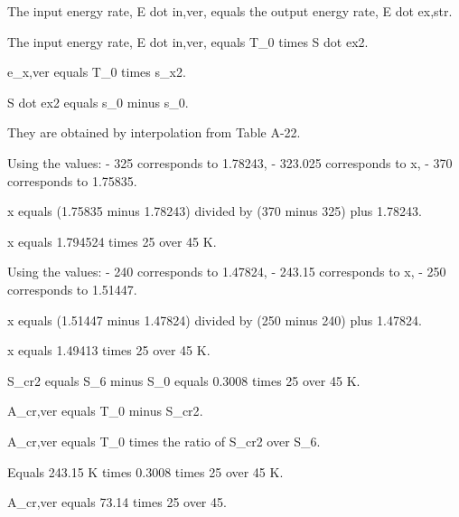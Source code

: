 The input energy rate, E dot in,ver, equals the output energy rate, E dot ex,str.

The input energy rate, E dot in,ver, equals T_0 times S dot ex2.

e_{x,ver} equals T_0 times s_{x2}.

S dot ex2 equals s_0 minus s_0.

They are obtained by interpolation from Table A-22.

Using the values:
- 325 corresponds to 1.78243,
- 323.025 corresponds to x,
- 370 corresponds to 1.75835.

x equals (1.75835 minus 1.78243) divided by (370 minus 325) plus 1.78243.

x equals 1.794524 times 25 over 45 K.

Using the values:
- 240 corresponds to 1.47824,
- 243.15 corresponds to x,
- 250 corresponds to 1.51447.

x equals (1.51447 minus 1.47824) divided by (250 minus 240) plus 1.47824.

x equals 1.49413 times 25 over 45 K.

S_{cr2} equals S_6 minus S_0 equals 0.3008 times 25 over 45 K.

A_{cr,ver} equals T_0 minus S_{cr2}.

A_{cr,ver} equals T_0 times the ratio of S_{cr2} over S_6.

Equals 243.15 K times 0.3008 times 25 over 45 K.

A_{cr,ver} equals 73.14 times 25 over 45.